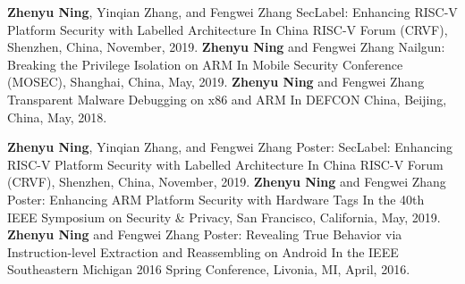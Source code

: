 \begin{cventries}
\cventry
    {\textbf{Zhenyu Ning}, Yinqian Zhang, and Fengwei Zhang} %
    {SecLabel: Enhancing RISC-V Platform Security with Labelled Architecture} %
    {} %
    {} %
    {In China RISC-V Forum (CRVF), Shenzhen, China, November, 2019.}
    \vspace{10pt}
  \cventry
    {\textbf{Zhenyu Ning} and Fengwei Zhang} %
    {Nailgun: Breaking the Privilege Isolation on ARM} %
    {} %
    {} %
    {In Mobile Security Conference (MOSEC), Shanghai, China, May, 2019.}
    \vspace{10pt}
  \cventry
    {\textbf{Zhenyu Ning} and Fengwei Zhang} %
    {Transparent Malware Debugging on x86 and ARM} %
    {} %
    {} %
    {In DEFCON China, Beijing, China, May, 2018.}
    \vspace{10pt}
\end{cventries}
    
\begin{cventries}
  \cventry
    {\textbf{Zhenyu Ning}, Yinqian Zhang, and Fengwei Zhang} %
    {Poster: SecLabel: Enhancing RISC-V Platform Security with Labelled Architecture} %
    {} %
    {} %
    {In China RISC-V Forum (CRVF), Shenzhen, China, November, 2019.}
    \vspace{10pt}
  \cventry
    {\textbf{Zhenyu Ning} and Fengwei Zhang} %
    {Poster: Enhancing ARM Platform Security with Hardware Tags} %
    {} %
    {} %
    {In the 40th IEEE Symposium on Security \& Privacy, San Francisco, California,
May, 2019.}
    \vspace{10pt}
  \cventry
    {\textbf{Zhenyu Ning} and Fengwei Zhang} %
    {Poster: Revealing True Behavior via Instruction-level Extraction and Reassembling on Android} %
    {} %
    {} %
    {In the IEEE Southeastern Michigan 2016 Spring Conference, Livonia, MI, April, 2016.}
    \vspace{10pt}
\end{cventries}

